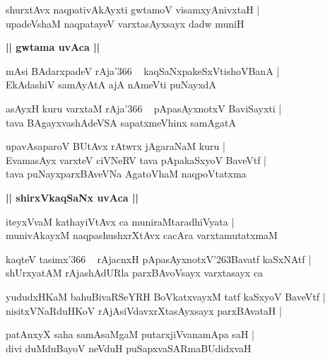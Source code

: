 \documentclass[twoside,12pt,openright]{book}
\def\S{\char'263}
\newcounter{shloka}[chapter]
\def\uvaca#1{\centerline{{\large\textbf{#1}}}}
\begin{document}
\begin{shloka}%
shurxtAvx naqpativAkAyxti gwtamoV visamxyAnivxtaH |\\
upadeVshaM naqpatayeV varxtasAyxsayx dadw muniH 
\end{shloka}

\uvaca{|| gwtama uvAca ||}

\begin{shloka}%
mAsi BAdarxpadeV rAja\char'366 ~ kaqSaNxpakeSxVtishoVBanA |\\
EkAdashiV samAyAtA ajA nAmeVti puNayxdA 
\end{shloka}

\begin{shloka}%
asAyxH kuru varxtaM rAja\char'366 ~ pApasAyxnotxV BaviSayxti |\\
tava BAgayxvashAdeVSA sapatxmeVhinx samAgatA
\end{shloka}

\begin{shloka}%
upavAsaparoV BUtAvx rAtwrx jAgaraNaM kuru |\\
EvamasAyx varxteV ciVNeRV tava pApakaSxyoV BaveVtf |\\
tava puNayxparxBAveVNa AgatoVhaM naqpoVtatxma
\end{shloka}

\uvaca{|| shirxVkaqSaNx uvAca ||}

\begin{shloka}%
iteyxVvaM kathayiVtAvx ca muniraMtaradhiVyata |\\
munivAkayxM naqpashushxrXtAvx cacAra varxtamutatxmaM
\end{shloka}

\begin{shloka}%
kaqteV tasimx\char'366 ~ rAjacnxH pApasAyxnotxV\S Bavatf kaSxNAtf |\\
shUrxyatAM rAjashAdURla parxBAvoVsayx varxtasayx ca 
\end{shloka}

\begin{shloka}%
yududxHKaM bahuBivaRSeYRH BoVkatxvayxM tatf kaSxyoV BaveVtf |\\
nisitxVNaRduHKoV rAjAsiVdavxrXtasAyxsayx parxBAvataH |\\
\end{shloka}

\begin{shloka}%
patAnxyX saha samAsaMgaM putarxjiVvanamApa saH |\\
divi duMduBayoV neVduH puSapxvaSARmaBUdidxvaH 
\end{shloka}
\end{document}
